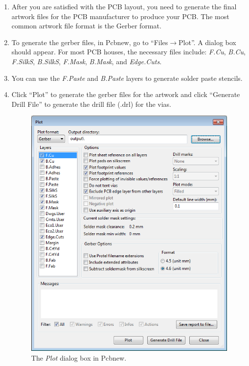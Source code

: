 \documentclass[12pt,letterpaper]{scrartcl}
\begin{document}
\begin{enumerate}
	\item After you are satisfied with the PCB layout, you need to generate the final artwork files for the PCB manufacturer to produce your PCB. The most common artwork file format is the Gerber format. 
	
	\item To generate the gerber files, in Pcbnew, go to ``Files$\rightarrow$Plot''. A dialog box should appear. For most PCB houses, the necessary files include: \emph{F.Cu}, \emph{B.Cu}, \emph{F.SilkS}, \emph{B.SilkS}, \emph{F.Mask}, \emph{B.Mask}, and \emph{Edge.Cuts}. 

	\item You can use the \emph{F.Paste} and \emph{B.Paste} layers to generate solder paste stencils. 
	
	\item Click ``Plot'' to generate the gerber files for the artwork and click ``Generate Drill File'' to generate the drill file (.drl) for the vias. 
		\begin{figure}[hp]
			\centering
			\includegraphics[width=4.5in]{generate-gerber}
			\caption{The \emph{Plot} dialog box in Pcbnew.}
			\label{fig:generate-gerber}
		\end{figure}
		
\end{enumerate}
\end{document}
